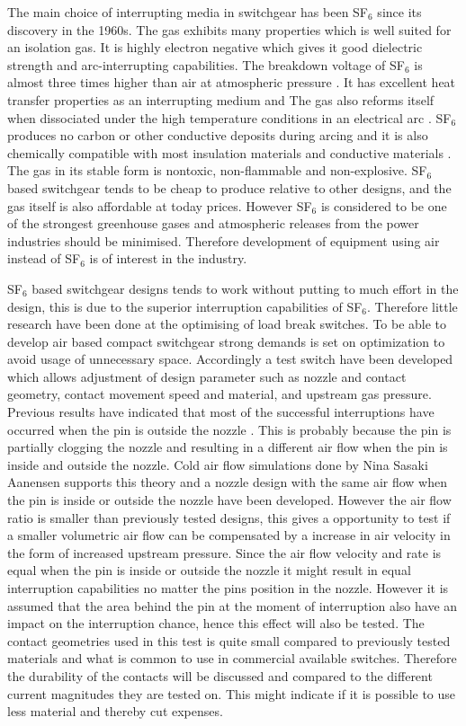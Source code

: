 \documentclass[10pt,a4paper]{article}
\begin{document}
The main choice of interrupting media in switchgear has been SF$_6$ since its discovery in the 1960s. The gas exhibits many properties which is well suited for an isolation gas. It is highly electron negative which gives it good dielectric strength and arc-interrupting capabilities. The breakdown voltage of SF$_6$ is almost three times higher than air at atmospheric pressure \cite{bib:SF6PI}. It has excellent heat transfer properties as an interrupting medium and The gas also reforms itself when dissociated under the high temperature conditions in an electrical arc  \cite{bib:SF6PI}. SF$_6$ produces no carbon or other conductive deposits during arcing and it is also chemically compatible with most insulation materials and conductive materials \cite{bib:SF6PI}. The gas in its stable form is nontoxic, non-flammable and non-explosive. SF$_6$ based switchgear tends to be cheap to produce relative to other designs, and the gas itself is also affordable at today prices. However SF$_6$ is considered to be one of the strongest greenhouse gases and atmospheric releases from the power industries should be minimised. Therefore development of equipment using air instead of SF$_6$ is of interest in the industry.

SF$_6$ based switchgear designs tends to work without putting to much effort in the design, this is due to the superior interruption capabilities of SF$_6$. Therefore little research have been done at the optimising of load break switches. To be able to develop air based compact switchgear strong demands is set on optimization to avoid usage of unnecessary space. Accordingly a test switch have been developed which allows adjustment of design parameter such as nozzle and contact geometry, contact movement speed and material, and upstream gas pressure. Previous results have indicated that most of the successful interruptions have occurred when the pin is outside the nozzle \cite{bib:CIAMVLBS}. This is probably because the pin is partially clogging the nozzle and resulting in a different air flow when the pin is inside and outside the nozzle. Cold air flow simulations done by Nina Sasaki Aanensen supports this theory and a nozzle design with the same air flow when the pin is inside or outside the nozzle have been developed. However the air flow ratio is smaller than previously tested designs, this gives a opportunity to test if a smaller volumetric air flow can be compensated by a increase in air velocity in the form of increased upstream pressure. Since the air flow velocity and rate is equal when the pin is inside or outside the nozzle it might result in equal interruption capabilities no matter the pins position in the nozzle. However it is assumed that the area behind the pin at the moment of interruption also have an impact on the interruption chance, hence this effect will also be tested. The contact geometries used in this test is quite small compared to previously tested materials and what is common to use in commercial available switches. Therefore the durability of the contacts will be discussed and compared to the different current magnitudes they are tested on. This might indicate if it is possible to use less material and thereby cut expenses.
\end{document}
